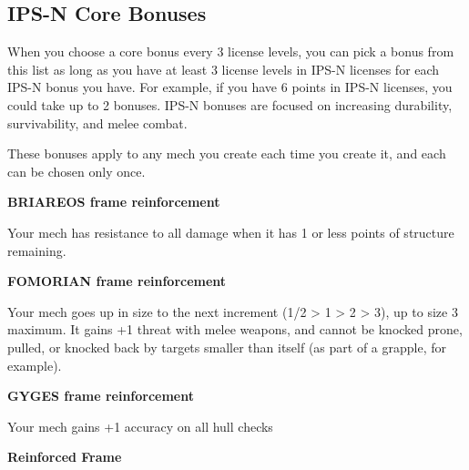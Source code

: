 \subsection{IPS-N Core Bonuses}

When you choose a core bonus every 3 license levels, you can pick a bonus from this list as long as you have at least 3 license levels in IPS-N licenses for each IPS-N bonus you have. For example, if you have 6 points in IPS-N licenses, you could take up to 2 bonuses. IPS-N bonuses are focused on increasing durability, survivability, and melee combat.

These bonuses apply to any mech you create each time you create it, and each can be chosen only once.


\textbf{BRIAREOS frame reinforcement}\newline
{}

Your mech has resistance to all damage when it has 1 or less points of structure remaining.


\textbf{FOMORIAN frame reinforcement}\newline
{}

Your mech goes up in size to the next increment (1/2 > 1 > 2 > 3), up to size 3 maximum. It gains +1 threat with melee weapons, and cannot be knocked prone, pulled, or knocked back by targets smaller than itself (as part of a grapple, for example).


\textbf{GYGES frame reinforcement}\newline
{}

Your mech gains +1 accuracy on all hull checks


\textbf{Reinforced Frame}\newline
{}

